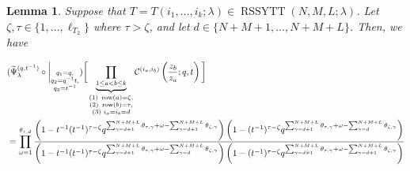 \documentclass[12pt,reqno,a4paper]{amsart}
\newcommand{\comp}{\circ}
\newcommand{\cals}[1]{\mathcal{#1}}
\numberwithin{equation}{section}
\newtheorem{lem}[thm]{Lemma}
\theoremstyle{definition}
\begin{document}
\begin{lem}
Suppose that $T = T(i_1,\dots,i_k;\lambda) \in \operatorname{RSSYTT}(N,M,L;\lambda)$. Let $\zeta, \tau \in \{1,\dots,\ell_{T_2}\}$ where $\tau > \zeta$, 
and let $d \in \{N+M+1,\dots,N+M+L\}$. Then, we have 

\footnotesize
\begin{align}
	&(
	\widetilde{\Psi}_{\lambda}^{(q,t^{-1})}
	\comp 
	\bigg|_{
		\substack{
			q_1 = q, \\
			q_2 = q^{-1}t,\\
			q_3 = t^{-1} \\
		}
	}
	)
	\bigg[
	\underbrace{	\prod_{1 \leq a < b \leq k}				}_{
		\substack{
			(1) \,\, \operatorname{row}(a) = \zeta, 
			\\
			(2) \,\,  \operatorname{row}(b) = \tau, 
			\\
			(3) \,\, i_a = i_b = d
		}	
	}
	\cals{C}^{(i_a,i_b)}\left(
	\frac{z_b}{z_a}
	; q, t
	\right)
	\bigg]
	\\
	&= 
	\prod_{\omega = 1}^{\theta_{\tau,d}}
	\frac{
		\left(		1 - t^{-1} (t^{-1})^{\tau - \zeta}	q^{	\sum_{\gamma = d+1}^{N + M + L}\theta_{\tau,\gamma}	+ \omega - 	\sum_{\gamma = d+ 1}^{N + M + L} \theta_{\zeta,\gamma}				}			\right)
		\left(
		1 - (t^{-1})^{\tau - \zeta}	q^{	\sum_{\gamma = d+1}^{N + M + L}\theta_{\tau,\gamma}	+ \omega - 	\sum_{\gamma = d}^{N + M + L} \theta_{\zeta,\gamma}				}		
		\right)
	}{
		\left(		1 - t^{-1} (t^{-1})^{\tau - \zeta}	q^{	\sum_{\gamma = d+1}^{N + M + L}\theta_{\tau,\gamma}	+ \omega - 	\sum_{\gamma = d}^{N + M + L} \theta_{\zeta,\gamma}				}			\right)
		\left(
		1 - (t^{-1})^{\tau - \zeta}	q^{	\sum_{\gamma = d+1}^{N + M + L}\theta_{\tau,\gamma}	+ \omega - 	\sum_{\gamma = d+1}^{N + M + L} \theta_{\zeta,\gamma}				}		
		\right)
	}
	\notag 
\end{align}
\normalsize
\end{lem}
\end{document}
